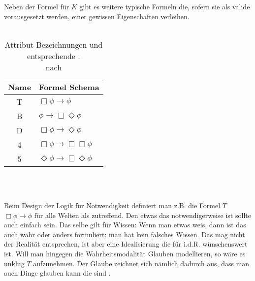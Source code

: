 Neben der Formel für $K$ gibt es weitere typische Formeln die, sofern sie als valide vorausgesetzt werden, einer \ML gewissen Eigenschaften verleihen.\\
\\
\begin{table}
	\label{tab:attributes}
	\centering
	\begin{tabular}{cl}
	\hline
	\hline
	Name & Formel Schema\\
	\hline
	T & $\Box \phi \rightarrow \phi$\\
	B & $\phi \rightarrow \Box \Diamond\phi$\\
	D & $\Box \phi \rightarrow \Diamond \phi$\\
	4 & $\Box \phi \rightarrow \Box \Box \phi$\\
	5 & $\Diamond \phi \rightarrow \Box \Diamond \phi$\\
	\hline
	\end{tabular}\\
	\caption{Attribut Bezeichnungen und entsprechende \formelSchemata. \\
	nach }
\end{table}
\\
Beim Design der Logik für Notwendigkeit definiert man z.B. die Formel $T$ $\Box \phi \rightarrow \phi$ für alle Welten als zutreffend.
Den etwas das notwendigerweise \true ist sollte auch einfach \true sein.
Das selbe gilt für Wissen: Wenn man etwas weis, dann ist das auch wahr oder anders formuliert: man hat kein falsches Wissen.
Das mag nicht der Realität entsprechen, ist aber eine Idealisierung die für \MAS i.d.R. wünschenswert ist.
Will man hingegen die Wahrheitsmodalität Glauben modellieren, so wäre es unklug $T$ aufzunehmen.
Der Glaube zeichnet sich nämlich dadurch aus, dass man auch Dinge glauben kann die \false sind .

